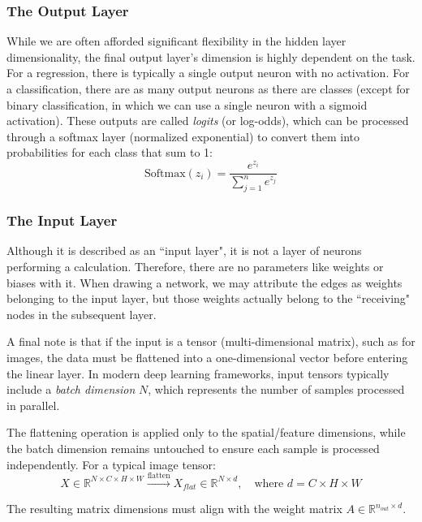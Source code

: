 \medskip

\subsubsection{The Output Layer}

While we are often afforded significant flexibility in the hidden layer dimensionality, the final output layer's dimension is highly dependent on the task. For a regression, there is typically a single output neuron with no activation. For a classification, there are as many output neurons as there are classes (except for binary classification, in which we can use a single neuron with a sigmoid activation). These outputs are called \textit{logits} (or log-odds), which can be processed through a softmax layer (normalized exponential) to convert them into probabilities for each class that sum to 1:
\[
\text{Softmax}(z_i) = \frac{e^{z_i}}{\sum_{j=1}^{n} e^{z_j}}
\]

\subsubsection{The Input Layer}

Although it is described as an ``input layer", it is not a layer of neurons performing a calculation. Therefore, there are no parameters like weights or biases with it. When drawing a network, we may attribute the edges as weights belonging to the input layer, but those weights actually belong to the ``receiving" nodes in the subsequent layer. 

A final note is that if the input is a tensor (multi-dimensional matrix), such as for images, the data must be flattened into a one-dimensional vector before entering the linear layer. In modern deep learning frameworks, input tensors typically include a \textit{batch dimension} $N$, which represents the number of samples processed in parallel. 

The flattening operation is applied only to the spatial/feature dimensions, while the batch dimension remains untouched to ensure each sample is processed independently. For a typical image tensor:
\[
X \in \mathbb{R}^{N \times C \times H \times W} \xrightarrow{\text{flatten}} X_{flat} \in \mathbb{R}^{N \times d}, \quad \text{where } d = C \times H \times W
\]

The resulting matrix dimensions must align with the weight matrix $A \in \mathbb{R}^{n_{out} \times d}$.

\bigskip

